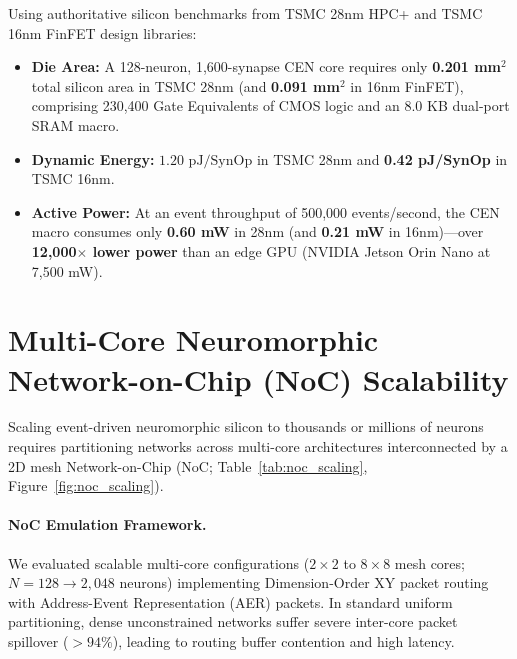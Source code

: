 \documentclass[11pt,letterpaper]{report}
\begin{document}
Using authoritative silicon benchmarks from TSMC 28nm HPC+ and TSMC 16nm FinFET design libraries:
\begin{itemize}[leftmargin=*]
    \item \textbf{Die Area:} A 128-neuron, 1,600-synapse CEN core requires only \textbf{0.201 mm$^2$} total silicon area in TSMC 28nm (and \textbf{0.091 mm$^2$} in 16nm FinFET), comprising 230,400 Gate Equivalents of CMOS logic and an 8.0 KB dual-port SRAM macro.
    \item \textbf{Dynamic Energy:} $1.20\text{ pJ/SynOp}$ in TSMC 28nm and \textbf{0.42 pJ/SynOp} in TSMC 16nm.
    \item \textbf{Active Power:} At an event throughput of 500,000 events/second, the CEN macro consumes only \textbf{0.60 mW} in 28nm (and \textbf{0.21 mW} in 16nm)---over \textbf{12,000$\times$ lower power} than an edge GPU (NVIDIA Jetson Orin Nano at 7,500 mW).
\end{itemize}

\section{Multi-Core Neuromorphic Network-on-Chip (NoC) Scalability}

Scaling event-driven neuromorphic silicon to thousands or millions of neurons requires partitioning networks across multi-core architectures interconnected by a 2D mesh Network-on-Chip (NoC; Table~\ref{tab:noc_scaling}, Figure~\ref{fig:noc_scaling}). 

\paragraph{NoC Emulation Framework.}
We evaluated scalable multi-core configurations ($2\times 2$ to $8\times 8$ mesh cores; $N = 128 \to 2,048$ neurons) implementing Dimension-Order XY packet routing with Address-Event Representation (AER) packets. In standard uniform partitioning, dense unconstrained networks suffer severe inter-core packet spillover ($>94\%$), leading to routing buffer contention and high latency.
\end{document}
